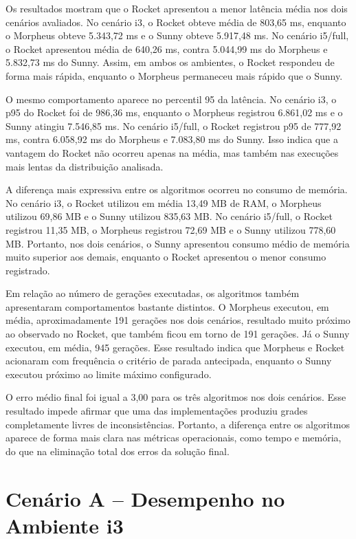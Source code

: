 Os resultados mostram que o Rocket apresentou a menor latência média nos dois cenários avaliados. No cenário i3, o Rocket obteve média de 803,65 ms, enquanto o Morpheus obteve 5.343,72 ms e o Sunny obteve 5.917,48 ms. No cenário i5/full, o Rocket apresentou média de 640,26 ms, contra 5.044,99 ms do Morpheus e 5.832,73 ms do Sunny. Assim, em ambos os ambientes, o Rocket respondeu de forma mais rápida, enquanto o Morpheus permaneceu mais rápido que o Sunny.

O mesmo comportamento aparece no percentil 95 da latência. No cenário i3, o p95 do Rocket foi de 986,36 ms, enquanto o Morpheus registrou 6.861,02 ms e o Sunny atingiu 7.546,85 ms. No cenário i5/full, o Rocket registrou p95 de 777,92 ms, contra 6.058,92 ms do Morpheus e 7.083,80 ms do Sunny. Isso indica que a vantagem do Rocket não ocorreu apenas na média, mas também nas execuções mais lentas da distribuição analisada.

A diferença mais expressiva entre os algoritmos ocorreu no consumo de memória. No cenário i3, o Rocket utilizou em média 13,49 MB de RAM, o Morpheus utilizou 69,86 MB e o Sunny utilizou 835,63 MB. No cenário i5/full, o Rocket registrou 11,35 MB, o Morpheus registrou 72,69 MB e o Sunny utilizou 778,60 MB. Portanto, nos dois cenários, o Sunny apresentou consumo médio de memória muito superior aos demais, enquanto o Rocket apresentou o menor consumo registrado.

Em relação ao número de gerações executadas, os algoritmos também apresentaram comportamentos bastante distintos. O Morpheus executou, em média, aproximadamente 191 gerações nos dois cenários, resultado muito próximo ao observado no Rocket, que também ficou em torno de 191 gerações. Já o Sunny executou, em média, 945 gerações. Esse resultado indica que Morpheus e Rocket acionaram com frequência o critério de parada antecipada, enquanto o Sunny executou próximo ao limite máximo configurado.

O erro médio final foi igual a 3,00 para os três algoritmos nos dois cenários. Esse resultado impede afirmar que uma das implementações produziu grades completamente livres de inconsistências. Portanto, a diferença entre os algoritmos aparece de forma mais clara nas métricas operacionais, como tempo e memória, do que na eliminação total dos erros da solução final.

\section{Cenário A -- Desempenho no Ambiente i3}
\label{sec:cenario-a-i3}

